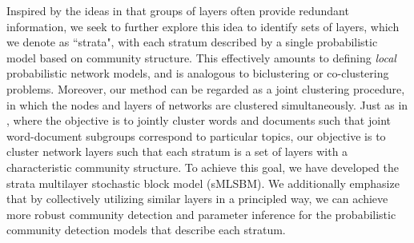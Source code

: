 \indent Inspired by the ideas in \cite{domen} that groups of layers often provide redundant information, we seek to further explore this idea to identify sets of layers, which we denote as ``strata", with each stratum described by a single probabilistic model based on community structure.  This effectively amounts to defining \emph{local} probabilistic network models, and is analogous to biclustering \cite{biclustering} or co-clustering \cite{cocluster} problems. Moreover, our method can be regarded as a joint clustering procedure, in which the nodes and layers of networks are clustered simultaneously. Just as in \cite{cocluster}, where the objective is to jointly cluster words and documents such that joint word-document subgroups correspond to particular topics, our objective is to cluster network layers such that each stratum is a set of layers with a characteristic community structure. To achieve this goal, we have developed the strata multilayer stochastic block model (sMLSBM). We additionally emphasize that by collectively utilizing similar layers in a principled way, we can achieve more robust community detection and parameter inference for the probabilistic community detection models that describe each stratum. 

